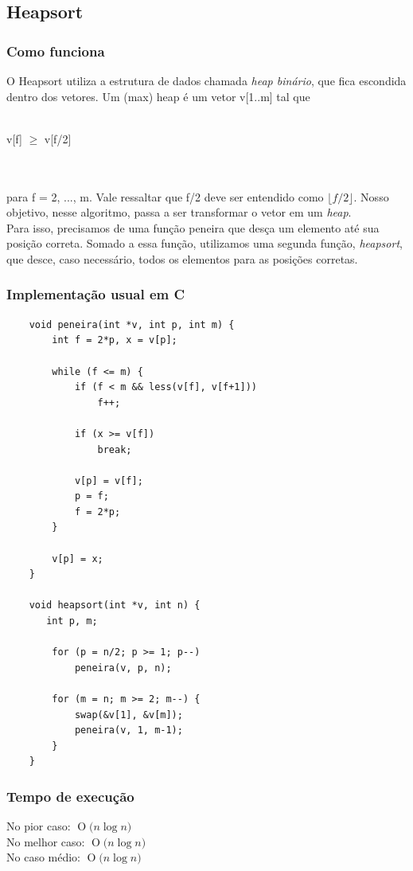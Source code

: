 \documentclass[12pt,a4paper]{article}
\newcommand{\BigO}[1]{\ensuremath{\operatorname{O}\bigl(#1\bigr)}}
\begin{document}
	\subsection{Heapsort}

	\subsubsection{Como funciona}
	\indent O Heapsort utiliza a estrutura de dados chamada \textit{heap binário}, que fica escondida dentro dos vetores. Um (max) heap é um vetor v[1..m] tal que\\\\
	\centerline{v[f]  $\geq$  v[f/2]}\\\\
	para f = 2, ..., m. Vale ressaltar que f/2 deve ser entendido como $\lfloor f/2 \rfloor$. Nosso objetivo, nesse algoritmo, passa a ser transformar o vetor em um \textit{heap}.\\
	\indent Para isso, precisamos de uma função peneira que desça um elemento até sua posição correta. Somado a essa função, utilizamos uma segunda função, \textit{heapsort}, que desce, caso necessário, todos os elementos para as posições corretas.


	\subsubsection{Implementação usual em C}
	\begin{minipage}{\linewidth}
	\begin{lstlisting}
	void peneira(int *v, int p, int m) {
		int f = 2*p, x = v[p];
		
		while (f <= m) {
			if (f < m && less(v[f], v[f+1])) 
				f++;
			
			if (x >= v[f])
				break;
			
			v[p] = v[f];
			p = f;
			f = 2*p;
		}

		v[p] = x;
	}

	void heapsort(int *v, int n) {
	   int p, m;

		for (p = n/2; p >= 1; p--)
			peneira(v, p, n);

		for (m = n; m >= 2; m--) {
			swap(&v[1], &v[m]);
			peneira(v, 1, m-1);
		}
	}
	\end{lstlisting}
	\end{minipage}

	\subsubsection{Tempo de execução}
	\indent No pior caso: \BigO{n\log{}n}\\
	\indent No melhor caso: \BigO{n\log{}n}\\
	\indent No caso médio: \BigO{n\log{}n}
\end{document}
